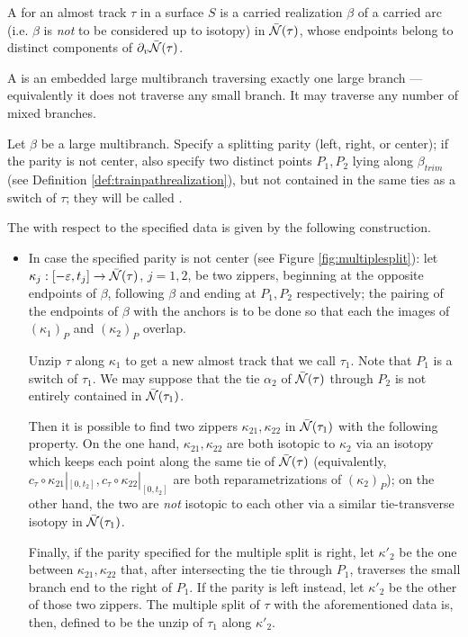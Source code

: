 \begin{defin}\label{def:multiplesplit}
A  for an almost track $\tau$ in a surface $S$ is a carried realization $\beta$ of a carried arc (i.e. $\beta$ is \emph{not} to be considered up to isotopy) in $\bar{{\mathcal N}}(\tau)$, whose endpoints belong to distinct components of $\partial_v\bar{{\mathcal N}}(\tau)$.

A  is an embedded large multibranch traversing exactly one large branch --- equivalently it does not traverse any small branch. It may traverse any number of mixed branches.

Let $\beta$ be a large multibranch. Specify a splitting parity (left, right, or center); if the parity is not center, also specify two distinct points $P_1,P_2$ lying along $\beta_{trim}$ (see Definition \ref{def:trainpathrealization}), but not contained in the same ties as a switch of $\tau$; they will be called . 

The  with respect to the specified data is given by the following construction.

\begin{itemize}
\item In case the specified parity is not center (see Figure \ref{fig:multiplesplit}): let $\kappa_j:[-\varepsilon,t_j]\rightarrow \bar{{\mathcal N}}(\tau)$, $j=1,2$, be two zippers, beginning at the opposite endpoints of $\beta$, following $\beta$ and ending at $P_1,P_2$ respectively; the pairing of the endpoints of $\beta$ with the anchors is to be done so that each the images of $(\kappa_1)_P$ and $(\kappa_2)_P$ overlap. 

Unzip $\tau$ along $\kappa_1$ to get a new almost track that we call $\tau_1$. Note that $P_1$ is a switch of $\tau_1$. We may suppose that the tie $\alpha_2$ of $\bar{{\mathcal N}}(\tau)$ through $P_2$ is not entirely contained in $\bar{{\mathcal N}}(\tau_1)$. 

Then it is possible to find two zippers $\kappa_{21},\kappa_{22}$ in $\bar{{\mathcal N}}(\tau_1)$ with the following property. On the one hand, $\kappa_{21},\kappa_{22}$ are both isotopic to $\kappa_2$ via an isotopy which keeps each point along the same tie of $\bar{{\mathcal N}}(\tau)$ (equivalently, $c_\tau\circ\kappa_{21}|_{[0,t_2]},c_\tau\circ\kappa_{22}|_{[0,t_2]}$ are both reparametrizations of $(\kappa_2)_P$); on the other hand, the two are \emph{not} isotopic to each other via a similar tie-transverse isotopy in $\bar{{\mathcal N}}(\tau_1)$.

Finally, if the parity specified for the multiple split is right, let $\kappa'_2$ be the one between $\kappa_{21},\kappa_{22}$ that, after intersecting the tie through $P_1$, traverses the small branch end to the right of $P_1$. If the parity is left instead, let $\kappa'_2$ be the other of those two zippers. The multiple split of $\tau$ with the aforementioned data is, then, defined to be the unzip of $\tau_1$ along $\kappa'_2$.


\end{itemize}
\end{defin}
